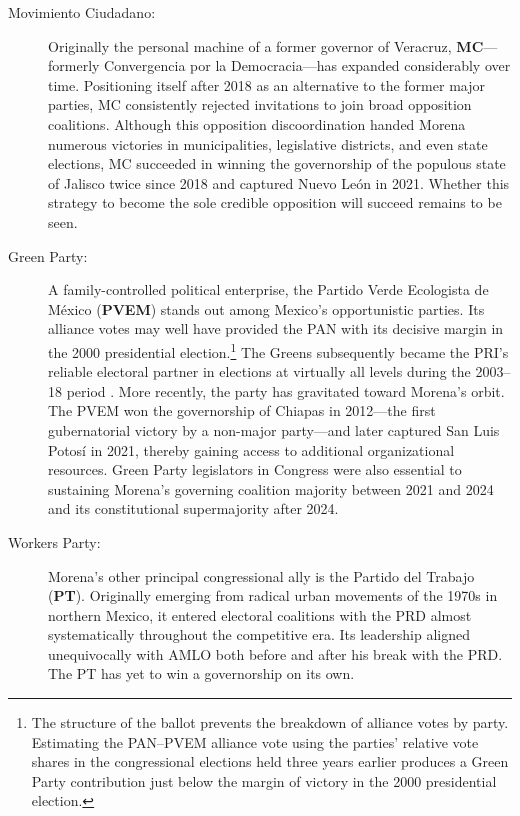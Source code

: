\documentclass[letter,12pt]{article}
\begin{document}
\begin{description}
\item[Movimiento Ciudadano:] Originally the personal machine of a former governor of Veracruz, \textbf{MC}---formerly Convergencia por la Democracia---has expanded considerably over time. Positioning itself after 2018 as an alternative to the former major parties, MC consistently rejected invitations to join broad opposition coalitions. Although this opposition discoordination handed Morena numerous victories in municipalities, legislative districts, and even state elections, MC succeeded in winning the governorship of the populous state of Jalisco twice since 2018 and captured Nuevo León in 2021. Whether this strategy to become the sole credible opposition will succeed remains to be seen.

\item[Green Party:] A family-controlled political enterprise, the Partido Verde Ecologista de México (\textbf{PVEM}) stands out among Mexico's opportunistic parties. Its alliance votes may well have provided the PAN with its decisive margin in the 2000 presidential election.\footnote{The structure of the ballot prevents the breakdown of alliance votes by party. Estimating the PAN--PVEM alliance vote using the parties’ relative vote shares in the congressional elections held three years earlier produces a Green Party contribution just below the margin of victory in the 2000 presidential election.} The Greens subsequently became the PRI's reliable electoral partner in elections at virtually all levels during the 2003--18 period \citep{spoon.pulido.PRI-PVEM2017}. More recently, the party has gravitated toward Morena's orbit. The PVEM won the governorship of Chiapas in 2012---the first gubernatorial victory by a non-major party---and later captured San Luis Potosí in 2021, thereby gaining access to additional organizational resources. Green Party legislators in Congress were also essential to sustaining Morena's governing coalition majority between 2021 and 2024 and its constitutional supermajority after 2024. 

\item[Workers Party:] Morena's other principal congressional ally is the Partido del Trabajo (\textbf{PT}). Originally emerging from radical urban movements of the 1970s in northern Mexico, it entered electoral coalitions with the PRD almost systematically throughout the competitive era. Its leadership aligned unequivocally with AMLO both before and after his break with the PRD. The PT has yet to win a governorship on its own.
\end{description}
\end{document}

